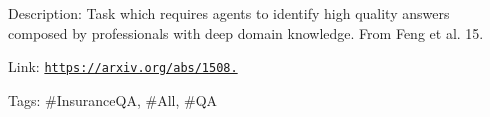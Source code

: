Description\+: Task which requires agents to identify high quality answers composed by professionals with deep domain knowledge. From Feng et al. \textquotesingle{}15.

Link\+: \href{https://arxiv.org/abs/1508.01585}{\tt https\+://arxiv.\+org/abs/1508.}

Tags\+: \#\+Insurance\+QA, \#\+All, \#\+QA 
